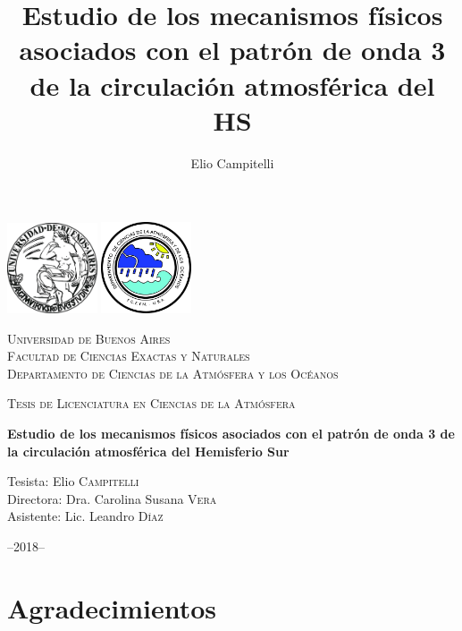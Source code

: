 \documentclass[spanish,a4paper,12pt,oneside]{book}
\title{Estudio de los mecanismos físicos asociados con el patrón de onda 3 de
la circulación atmosférica del HS}
\author{Elio Campitelli}
\date{}
\begin{document}
\maketitle

\frontmatter

\begin{titlepage}
    \centering
    \includegraphics[width=0.2\textwidth]{logoUBA}  \hfill \includegraphics[width=0.2\textwidth]{logoDCAO} \par
    \vspace{0.5cm}
    {\scshape\LARGE Universidad de Buenos Aires  \\
    \large Facultad de Ciencias Exactas y Naturales \\
Departamento de Ciencias de la Atmósfera y los Océanos  \par}
    \vspace{0.5cm}
    {\scshape\Large Tesis de Licenciatura en Ciencias de la Atmósfera\par}
    \vspace{1cm}
    {\huge\bfseries Estudio de los mecanismos físicos asociados con el patrón de onda 3 de la circulación atmosférica del Hemisferio Sur\par}
    \vspace{1.5cm}
    {\Large Tesista: Elio \textsc{Campitelli} \\
        Directora:  Dra. Carolina Susana \textsc{Vera} \\
        Asistente: Lic. Leandro \textsc{Díaz}
    \par}
    \vfill

    {\large --2018--\par}
\end{titlepage}

\chapter*{Agradecimientos}
\end{document}
